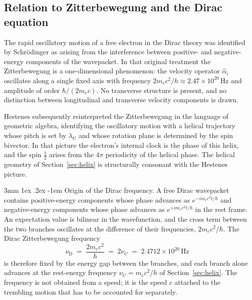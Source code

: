 \documentclass[%
 reprint, amsmath,amssymb, aps, prb, ]{revtex4-2}
\makeatletter
\numberwithin{equation}{section}
\renewcommand\paragraph{%
  \@startsection{paragraph}{4}{\z@}%
    {3mm \@plus 1ex \@minus .2ex}%
    {-1em}%
    {\normalfont\normalsize\itshape}}
\newcommand{\lambdaC}{\lambda_{\mathrm{C}}}
\makeatother
\begin{document}
\subsection{Relation to Zitterbewegung and the Dirac equation}
\label{subsec:zb_dirac}

The rapid oscillatory motion of a free electron in the Dirac theory was identified by Schr\"{o}dinger \cite{Schrodinger1930} as arising from the interference between positive- and negative-energy components of the wavepacket. In that original treatment the Zitterbewegung is a one-dimensional phenomenon: the velocity operator $\hat{\alpha}_i$ oscillates along a single fixed axis with frequency $2m_ec^2/h \approx 2.47\times10^{20}\,\mathrm{Hz}$ and amplitude of order $\hbar/(2m_ec)$. No transverse structure is present, and no distinction between longitudinal and transverse velocity components is drawn.

Hestenes \cite{Hestenes2003} subsequently reinterpreted the Zitterbewegung in the language of geometric algebra, identifying the oscillatory motion with a helical trajectory whose pitch is set by $\lambdaC$ and whose rotation plane is determined by the spin bivector. In that picture the electron's internal clock is the phase of this helix, and the spin $\tfrac{1}{2}$ arises from the $4\pi$ periodicity of the helical phase. The helical geometry of Section~\ref{sec:helix} is structurally consonant with the Hestenes picture.

\paragraph{Origin of the Dirac frequency.} A free Dirac wavepacket contains positive-energy components whose phase advances as $e^{-im_ec^2t/\hbar}$ and negative-energy components whose phase advances as $e^{+im_ec^2t/\hbar}$ in the rest frame. An expectation value is bilinear in the wavefunction, and the cross term between the two branches oscillates at the difference of their frequencies, $2m_ec^2/\hbar$. The Dirac Zitterbewegung frequency
\begin{equation}
\nu_{\mathrm{D}} \;=\; \frac{2m_ec^2}{h} \;=\; 2\nu_C \;=\; 2.4712\times10^{20}\,\mathrm{Hz}
\label{eq:nuD51}
\end{equation}
is therefore fixed by the energy gap between the branches, and each branch alone advances at the rest-energy frequency $\nu_C = m_ec^2/h$ of Section~\ref{sec:helix}. The frequency is not obtained from a speed; it is the speed $c$ attached to the trembling motion that has to be accounted for separately.
\end{document}
